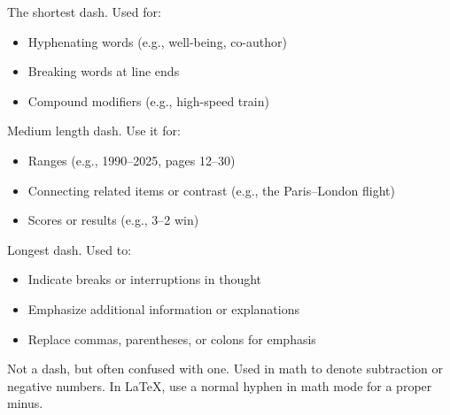 \begin{description}[style=nextline, leftmargin=1cm]

    \item[Hyphen (-) (\texttt{-})]
    The shortest dash. Used for:
    \begin{itemize}
        \item Hyphenating words (e.g., well-being, co-author)
        \item Breaking words at line ends
        \item Compound modifiers (e.g., high-speed train)
    \end{itemize}

    \item[En dash (--) (\texttt{- -})]
    Medium length dash. Use it for:
    \begin{itemize}
        \item Ranges (e.g., 1990--2025, pages 12--30)
        \item Connecting related items or contrast (e.g., the Paris--London flight)
        \item Scores or results (e.g., 3--2 win)
    \end{itemize}

    \item[Em dash (---) (\texttt{- - -})]
    Longest dash. Used to:
    \begin{itemize}
        \item Indicate breaks or interruptions in thought
        \item Emphasize additional information or explanations
        \item Replace commas, parentheses, or colons for emphasis
    \end{itemize}

    \item[Minus sign ($-$)]
    Not a dash, but often confused with one. Used in math to denote subtraction or negative numbers. In \LaTeX, use a normal hyphen in math mode for a proper minus.

\end{description}


